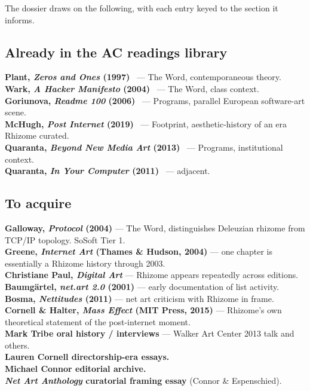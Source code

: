 \documentclass[10pt,letterpaper,twocolumn]{article}
\begin{document}
The dossier draws on the following, with each entry keyed to the section it informs.

\subsection{Already in the AC readings library}

\textbf{Plant, \emph{Zeros and Ones} (1997)}~\citep{plant1997zeros} --- The Word, contemporaneous theory.\\
\textbf{Wark, \emph{A Hacker Manifesto} (2004)}~\citep{wark2004hacker} --- The Word, class context.\\
\textbf{Goriunova, \emph{Readme 100} (2006)}~\citep{goriunova2006readme} --- Programs, parallel European software-art scene.\\
\textbf{McHugh, \emph{Post Internet} (2019)}~\citep{mchugh2019post} --- Footprint, aesthetic-history of an era Rhizome curated.\\
\textbf{Quaranta, \emph{Beyond New Media Art} (2013)}~\citep{quaranta2013beyond} --- Programs, institutional context.\\
\textbf{Quaranta, \emph{In Your Computer} (2011)}~\citep{quaranta2011computer} --- adjacent.

\subsection{To acquire}

\textbf{Galloway, \emph{Protocol} (2004)} --- The Word, distinguishes Deleuzian rhizome from TCP/IP topology. SoSoft Tier 1.\\
\textbf{Greene, \emph{Internet Art} (Thames \& Hudson, 2004)} --- one chapter is essentially a Rhizome history through 2003.\\
\textbf{Christiane Paul, \emph{Digital Art}} --- Rhizome appears repeatedly across editions.\\
\textbf{Baumg\"artel, \emph{net.art 2.0} (2001)} --- early documentation of list activity.\\
\textbf{Bosma, \emph{Nettitudes} (2011)} --- net art criticism with Rhizome in frame.\\
\textbf{Cornell \& Halter, \emph{Mass Effect} (MIT Press, 2015)} --- Rhizome's own theoretical statement of the post-internet moment.\\
\textbf{Mark Tribe oral history / interviews} --- Walker Art Center 2013 talk and others.\\
\textbf{Lauren Cornell directorship-era essays.}\\
\textbf{Michael Connor editorial archive.}\\
\textbf{\emph{Net Art Anthology} curatorial framing essay} (Connor \& Espenschied).
\end{document}
